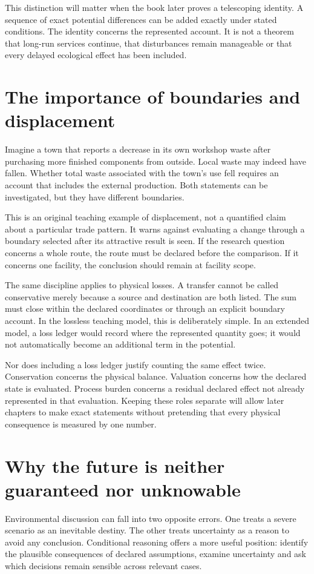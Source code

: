 This distinction will matter when the book later proves a telescoping identity. A sequence of exact potential differences can be added exactly under stated conditions. The identity concerns the represented account. It is not a theorem that long-run services continue, that disturbances remain manageable or that every delayed ecological effect has been included.

\section{The importance of boundaries and displacement}
Imagine a town that reports a decrease in its own workshop waste after purchasing more finished components from outside. Local waste may indeed have fallen. Whether total waste associated with the town's use fell requires an account that includes the external production. Both statements can be investigated, but they have different boundaries.

This is an original teaching example of displacement, not a quantified claim about a particular trade pattern. It warns against evaluating a change through a boundary selected after its attractive result is seen. If the research question concerns a whole route, the route must be declared before the comparison. If it concerns one facility, the conclusion should remain at facility scope.

The same discipline applies to physical losses. A transfer cannot be called conservative merely because a source and destination are both listed. The sum must close within the declared coordinates or through an explicit boundary account. In the lossless teaching model, this is deliberately simple. In an extended model, a loss ledger would record where the represented quantity goes; it would not automatically become an additional term in the potential.

Nor does including a loss ledger justify counting the same effect twice. Conservation concerns the physical balance. Valuation concerns how the declared state is evaluated. Process burden concerns a residual declared effect not already represented in that evaluation. Keeping these roles separate will allow later chapters to make exact statements without pretending that every physical consequence is measured by one number.

\section{Why the future is neither guaranteed nor unknowable}
Environmental discussion can fall into two opposite errors. One treats a severe scenario as an inevitable destiny. The other treats uncertainty as a reason to avoid any conclusion. Conditional reasoning offers a more useful position: identify the plausible consequences of declared assumptions, examine uncertainty and ask which decisions remain sensible across relevant cases.


